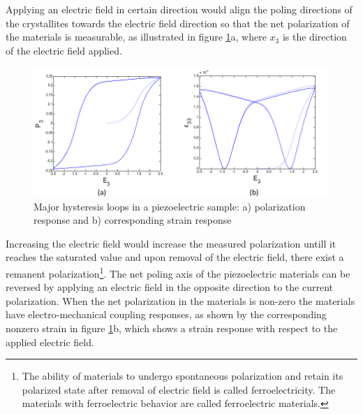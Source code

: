 Applying an electric field in certain direction would align the poling directions of the crystallites towards the electric field direction so that the net polarization of the materials is measurable,
 as illustrated in figure \ref{fig:Majorhysteresisloops}a, where $x_3$ is the direction of the electric field applied. 
\begin{figure}
\centering
\includegraphics[width=6in]{./chap_2_pol_sw/figures/majorloop_polarization_switching.pdf}
\caption{Major hysteresis loops in a piezoelectric sample: a) polarization response and b) corresponding strain response}
\label{fig:Majorhysteresisloops}
\end{figure} 
Increasing the electric field would increase the measured polarization untill it
reaches the saturated value and upon removal of the electric field, there exist a remanent polarization\footnote{The ability of materials to undergo spontaneous polarization and retain its polarized state after removal of electric field is called ferroelectricity. The materials with ferroelectric behavior are called ferroelectric materials.}. The net poling axis of the piezoelectric materials can be reversed by applying an electric field in the opposite direction to the current polarization. When the net polarization in the materials is non-zero the materials have electro-mechanical coupling responses,
 as shown by the corresponding nonzero strain in figure \ref{fig:Majorhysteresisloops}b, which shows a strain response with respect to the applied electric field.


